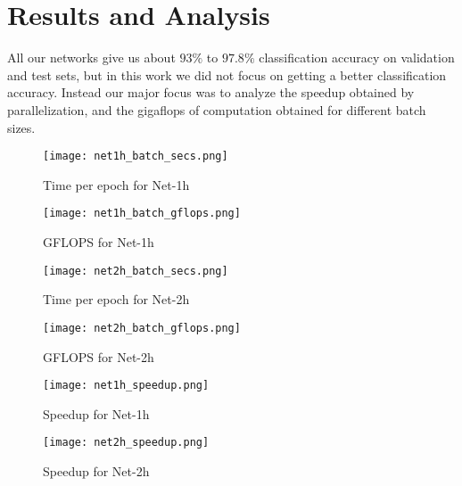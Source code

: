 \section{Results and Analysis}
\label{Results}

All our networks give us about $93\%$ to $97.8\%$ classification accuracy on validation and test sets, but in this work we did not focus on getting a better classification accuracy.
Instead our major focus was to analyze the speedup obtained by parallelization, and the gigaflops of computation obtained for different batch sizes.

\begin{figure}[ht]
    \centering
    \begin{minipage}[t]{0.45\textwidth}
        \texttt{[image: net1h\_batch\_secs.png]}
        \caption{Time per epoch for Net-1h}
		\label{fig:nn1_time}
    \end{minipage}
    \begin{minipage}[t]{0.45\textwidth}   
		\texttt{[image: net1h\_batch\_gflops.png]}
		\caption{GFLOPS for Net-1h}
		\label{fig:nn1_gflops}
    \end{minipage}
\end{figure}

\begin{figure}[ht]
    \centering
    \begin{minipage}[t]{0.45\textwidth}
        \texttt{[image: net2h\_batch\_secs.png]}
        \caption{Time per epoch for Net-2h}
		\label{fig:nn2_time}
    \end{minipage}
    \begin{minipage}[t]{0.45\textwidth}   
		\texttt{[image: net2h\_batch\_gflops.png]}
		\caption{GFLOPS for Net-2h}
		\label{fig:nn2_gflops}
    \end{minipage}
\end{figure}

\begin{figure}[ht]
    \centering
    \begin{minipage}[t]{0.45\textwidth}
        \texttt{[image: net1h\_speedup.png]}
        \caption{Speedup for Net-1h}
		\label{fig:nn1_speedup}
    \end{minipage}
    \begin{minipage}[t]{0.45\textwidth}   
		\texttt{[image: net2h\_speedup.png]}
		\caption{Speedup for Net-2h}
		\label{fig:nn2_speedup}
    \end{minipage}
\end{figure}

